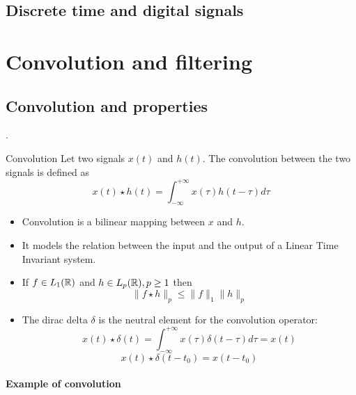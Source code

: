     \subsection{Discrete time and digital signals}
    \label{sec:}
    

\section{Convolution and filtering}
\label{sec:conv_filtering}

\subsection{Convolution and properties}
\label{sec:}

.
\begin{block}{Convolution}
  Let two signals $x(t)$ and $h(t)$. The convolution between the two signals
  is defined as
  \begin{equation}
    x(t)\star h(t) =  \int_{-\infty}^{+\infty}x(\tau)h(t-\tau)d\tau
    \label{eq:convolution}
  \end{equation}\vspace{-5mm}
  \begin{itemize}
    \item Convolution is a bilinear mapping between $x$ and $h$.
    \item It models the relation between the input and the output of a Linear
    Time Invariant system.
    \item If $f\in L_1(\mathbb{R})$ and $h\in L_p(\mathbb{R}), p\geq1$ then
    $$ \|f\star h\|_p\leq\|f\|_1\|h\|_p $$
    \item The dirac delta $\delta$ is the neutral element for the convolution operator:
\begin{equation}
      \label{eq:dirac_conv}
     x(t)\star \delta(t) =\int_{-\infty}^{+\infty}x(\tau)\delta(t-\tau)d\tau=  x(t)
    \end{equation}
    \begin{equation}
      \label{eq:dirac_conv_tz}
     x(t)\star \delta(t-t_0) = x(t-t_0)
    \end{equation}
  \end{itemize}

\end{block}


\paragraph{Example of convolution}
 
